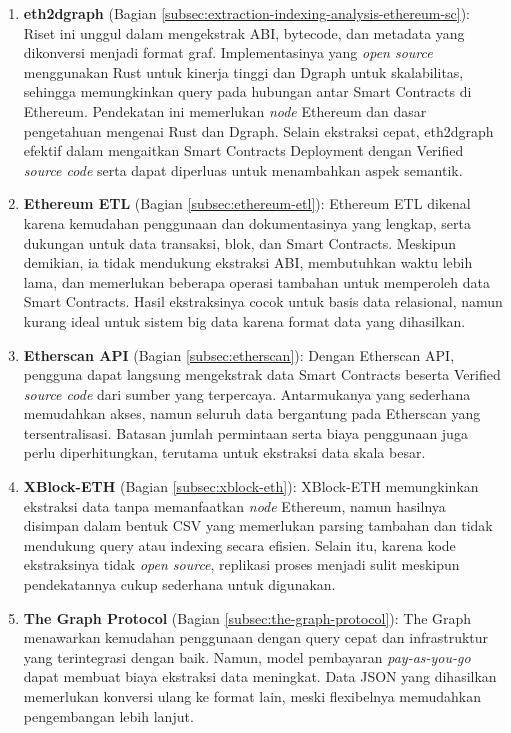 \begin{enumerate}
	\item \textbf{eth2dgraph} \parencite{aimar2023extraction} (Bagian \ref{subsec:extraction-indexing-analysis-ethereum-sc}): Riset ini unggul dalam mengekstrak ABI, bytecode, dan metadata yang dikonversi menjadi format graf. Implementasinya yang \textit{open source} menggunakan Rust untuk kinerja tinggi dan Dgraph untuk skalabilitas, sehingga memungkinkan query pada hubungan antar Smart Contracts di Ethereum. Pendekatan ini memerlukan \textit{node} Ethereum dan dasar pengetahuan mengenai Rust dan Dgraph. Selain ekstraksi cepat, eth2dgraph efektif dalam mengaitkan Smart Contracts Deployment dengan Verified \textit{source code} serta dapat diperluas untuk menambahkan aspek semantik.

	\item \textbf{Ethereum ETL} \parencite{ethereum_etl} (Bagian \ref{subsec:ethereum-etl}): Ethereum ETL dikenal karena kemudahan penggunaan dan dokumentasinya yang lengkap, serta dukungan untuk data transaksi, blok, dan Smart Contracts. Meskipun demikian, ia tidak mendukung ekstraksi ABI, membutuhkan waktu lebih lama, dan memerlukan beberapa operasi tambahan untuk memperoleh data Smart Contracts. Hasil ekstraksinya cocok untuk basis data relasional, namun kurang ideal untuk sistem big data karena format data yang dihasilkan.

	\item \textbf{Etherscan API} \parencite{etherscan2024} (Bagian \ref{subsec:etherscan}): Dengan Etherscan API, pengguna dapat langsung mengekstrak data Smart Contracts beserta Verified \textit{source code} dari sumber yang terpercaya. Antarmukanya yang sederhana memudahkan akses, namun seluruh data bergantung pada Etherscan yang tersentralisasi. Batasan jumlah permintaan serta biaya penggunaan juga perlu diperhitungkan, terutama untuk ekstraksi data skala besar.

	\item \textbf{XBlock-ETH} \parencite{zheng2020xblock} (Bagian \ref{subsec:xblock-eth}): XBlock-ETH memungkinkan ekstraksi data tanpa memanfaatkan \textit{node} Ethereum, namun hasilnya disimpan dalam bentuk CSV yang memerlukan parsing tambahan dan tidak mendukung query atau indexing secara efisien. Selain itu, karena kode ekstraksinya tidak \textit{open source}, replikasi proses menjadi sulit meskipun pendekatannya cukup sederhana untuk digunakan.

	\item \textbf{The Graph Protocol} \parencite{TheGraphDocs} (Bagian \ref{subsec:the-graph-protocol}): The Graph menawarkan kemudahan penggunaan dengan query cepat dan infrastruktur yang terintegrasi dengan baik. Namun, model pembayaran \textit{pay-as-you-go} dapat membuat biaya ekstraksi data meningkat. Data JSON yang dihasilkan memerlukan konversi ulang ke format lain, meski flexibelnya memudahkan pengembangan lebih lanjut.


\end{enumerate}
